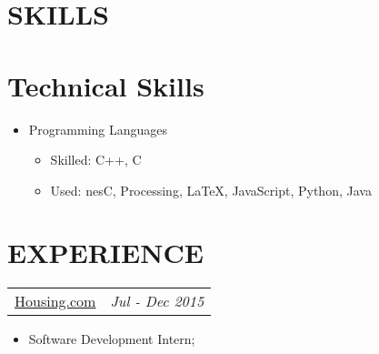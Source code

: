 \documentclass[margin]{res}
\begin{document}
\begin{resume}
\section{SKILLS} 
\normalsize{\section{Technical Skills}}
                 \begin{itemize}
                 \item[] Programming Languages 
                 	\begin{itemize}
                 	\item Skilled: C++, C
                 	\item Used: nesC, Processing, \LaTeX, JavaScript, Python, Java
                 	
                 	\end{itemize}
                 \end{itemize}

                  
\section{EXPERIENCE}      
					\begin{tabular}{p{4.2in} r} 
					\href{https://housing.com/in}{Housing.com} &  \textit{Jul - Dec 2015} 
					 \end{tabular}	
                   \begin{itemize} %
                    \item[] Software Development Intern; 
                        \begin{itemize}
                        

\end{itemize}
\end{itemize}
\end{resume}
\end{document}
